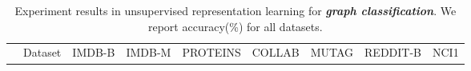 {\begin{table}[htbp]
\begin{threeparttable}
    \end{threeparttable}
    \label{tab:node_clf}
\end{table}

\begin{table}[htbp]
    \centering
    \caption{\textmd{Experiment results in unsupervised representation learning for \textbf{\textit{graph classification}}. We report accuracy(\%) for all datasets.}}
    \begin{threeparttable}
    \begin{tabular}{c|c|ccccccc}
        \toprule[1.2pt]
              & Dataset  & IMDB-B     & IMDB-M     & PROTEINS   & COLLAB     & MUTAG      & REDDIT-B   & NCI1     \\ %


\end{tabular}
\end{threeparttable}
\end{table}}
